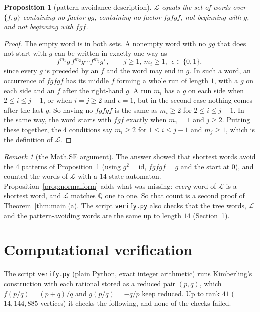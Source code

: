 \documentclass[11pt]{article}
\newtheorem{proposition}[theorem]{Proposition}
\theoremstyle{definition}
\theoremstyle{remark}
\newtheorem{remark}[theorem]{Remark}
\newcommand{\Q}{\mathbb{Q}}
\newcommand{\lang}{\mathcal{L}}
\begin{document}
\begin{proposition}[pattern-avoidance description]\label{prop:lang}
$\lang$ equals the set of words over $\{f,g\}$ containing no factor $gg$, containing no factor
$fgfgf$, not beginning with $g$, and not beginning with $fgf$.
\end{proposition}

\begin{proof}
The empty word is in both sets. A nonempty word with no $gg$ that does not start with $g$ can be
written in exactly one way as
\[
f^{m_1}g\,f^{m_2}g\cdots f^{m_j}g^{\,\epsilon},\qquad j\ge1,\ m_i\ge1,\ \ \epsilon\in\{0,1\},
\]
since every $g$ is preceded by an $f$ and the word may end in $g$. In such a word, an occurrence of
$fgfgf$ has its middle $f$ forming a whole run of length $1$, with a $g$ on each side and an $f$
after the right-hand $g$. A run $m_i$ has a $g$ on each side when $2\le i\le j-1$, or when $i=j\ge2$
and $\epsilon=1$, but in the second case nothing comes after the last $g$. So having no $fgfgf$ is
the same as $m_i\ge2$ for $2\le i\le j-1$. In the same way, the word starts with $fgf$ exactly when
$m_1=1$ and $j\ge2$. Putting these together, the 4 conditions say $m_i\ge2$ for $1\le i\le j-1$ and
$m_j\ge1$, which is the definition of $\lang$.
\end{proof}

\begin{remark}[the Math.SE argument]\label{rem:mmz}
The answer \cite{mmz} showed that shortest words avoid the 4 patterns of
Proposition~\ref{prop:lang} (using $g^{2}=\mathrm{id}$, $fgfgf=g$ and the start at $0$), and counted
the words of $\lang$ with a $14$-state automaton. Proposition~\ref{prop:normalform} adds what was missing: \emph{every}
word of $\lang$ is a shortest word, and $\lang$ matches $\Q$ one to one. So that count is a second
proof of Theorem~\ref{thm:main}(a). The script \texttt{verify.py} also checks that the tree
words, $\lang$ and the pattern-avoiding words are the same up to length $14$
(Section~\ref{sec:verify}).
\end{remark}

\section{Computational verification}\label{sec:verify}

The script \texttt{verify.py} (plain Python, exact integer arithmetic) runs Kimberling's
construction with each rational stored as a reduced pair $(p,q)$, which $f(p/q)=(p+q)/q$ and
$g(p/q)=-q/p$ keep reduced. Up to rank $41$ ($14{,}144{,}885$ vertices) it checks the following,
and none of the checks failed.
\end{document}
